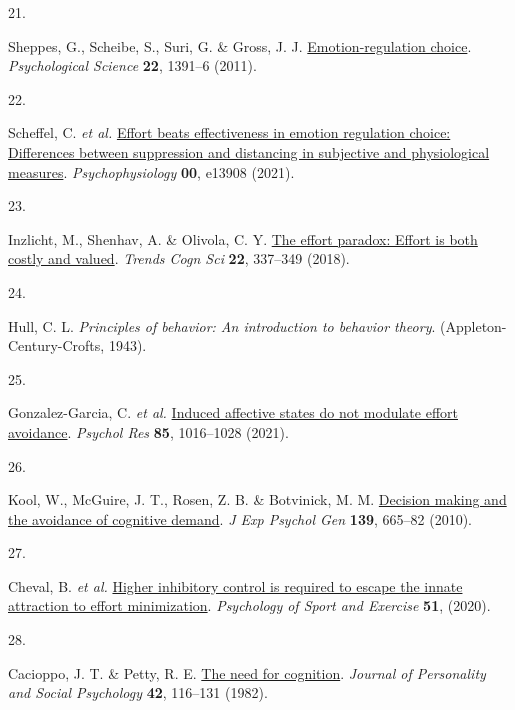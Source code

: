 \documentclass[
  man,floatsintext]{apa6}
\newlength{\cslhangindent}
\newlength{\csllabelwidth}
\newlength{\cslentryspacingunit} %
\newenvironment{CSLReferences}[2] %
 {%
  \setlength{\parindent}{0pt}
  \ifodd #1
  \let\oldpar\par
  \def\par{\hangindent=\cslhangindent\oldpar}
  \fi
  \setlength{\parskip}{#2\cslentryspacingunit}
 }%
 {}
\newcommand{\CSLLeftMargin}[1]{\parbox[t]{\csllabelwidth}{#1}}
\newcommand{\CSLRightInline}[1]{\parbox[t]{\linewidth - \csllabelwidth}{#1}\break}
\begin{document}
\begin{CSLReferences}{0}{0}
\leavevmode{}%
\CSLLeftMargin{21. }%
\CSLRightInline{Sheppes, G., Scheibe, S., Suri, G. \& Gross, J. J. \href{https://doi.org/10.1177/0956797611418350}{Emotion-regulation choice}. \emph{Psychological Science} \textbf{22}, 1391--6 (2011).}

\leavevmode{}%
\CSLLeftMargin{22. }%
\CSLRightInline{Scheffel, C. \emph{et al.} \href{https://doi.org/10.1111/psyp.13908}{Effort beats effectiveness in emotion regulation choice: Differences between suppression and distancing in subjective and physiological measures}. \emph{Psychophysiology} \textbf{00}, e13908 (2021).}

\leavevmode{}%
\CSLLeftMargin{23. }%
\CSLRightInline{Inzlicht, M., Shenhav, A. \& Olivola, C. Y. \href{https://doi.org/10.1016/j.tics.2018.01.007}{The effort paradox: Effort is both costly and valued}. \emph{Trends Cogn Sci} \textbf{22}, 337--349 (2018).}

\leavevmode{}%
\CSLLeftMargin{24. }%
\CSLRightInline{Hull, C. L. \emph{Principles of behavior: An introduction to behavior theory}. (Appleton-Century-Crofts, 1943).}

\leavevmode{}%
\CSLLeftMargin{25. }%
\CSLRightInline{Gonzalez-Garcia, C. \emph{et al.} \href{https://doi.org/10.1007/s00426-020-01300-9}{Induced affective states do not modulate effort avoidance}. \emph{Psychol Res} \textbf{85}, 1016--1028 (2021).}

\leavevmode{}%
\CSLLeftMargin{26. }%
\CSLRightInline{Kool, W., McGuire, J. T., Rosen, Z. B. \& Botvinick, M. M. \href{https://doi.org/10.1037/a0020198}{Decision making and the avoidance of cognitive demand}. \emph{J Exp Psychol Gen} \textbf{139}, 665--82 (2010).}

\leavevmode{}%
\CSLLeftMargin{27. }%
\CSLRightInline{Cheval, B. \emph{et al.} \href{https://doi.org/ARTN\%20101781\%0A10.1016/j.psychsport.2020.101781}{Higher inhibitory control is required to escape the innate attraction to effort minimization}. \emph{Psychology of Sport and Exercise} \textbf{51}, (2020).}

\leavevmode{}%
\CSLLeftMargin{28. }%
\CSLRightInline{Cacioppo, J. T. \& Petty, R. E. \href{https://doi.org/10.1037//0022-3514.42.1.116}{The need for cognition}. \emph{Journal of Personality and Social Psychology} \textbf{42}, 116--131 (1982).}


\end{CSLReferences}
\end{document}
